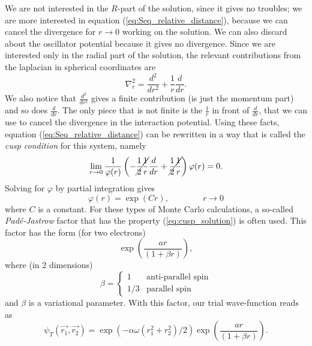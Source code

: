 \documentclass[a4paper,twoside,11pt]{book}
\begin{document}
We are not interested in the $R$-part of the solution, since it gives no troubles; we are more interested in equation (\ref{eq:Seq_relative_distance}), because we can cancel the divergence for $r \to 0$ working on the solution. We can also discard about the oscillator potential because it gives no divergence. Since we are interested only in the radial part of the solution, the relevant contributions from the laplacian in spherical coordinates are
\begin{equation}
    \nabla^2_r = \frac{d^2}{dr^2} + \frac{1}{r}\frac{d}{dr}.
\end{equation}
We also notice that $\frac{d^2}{dr^2}$ gives a finite contribution (is just the momentum part) and so does $\frac{d}{dr}$. The only piece that is not finite is the $\frac{1}{r}$ in front of $\frac{d}{dr}$, that we can use to cancel the divergence in the interaction potential. Using these facts, equation (\ref{eq:Seq_relative_distance}) can be rewritten in a way that is called the \emph{cusp condition} for this system, namely
\begin{equation}
    \lim_{r \to 0} \frac{1}{\varphi(r)}\left( -\cancel{\frac{1}{2}\frac{1}{r}}\frac{d}{dr} + \cancel{\frac{1}{2}\frac{1}{r}} \right)\varphi(r) = 0.
\end{equation}
Solving for $\varphi$ by partial integration gives
\begin{equation}
    \varphi(r) = \exp(Cr),
    \qquad\qquad
    r \to 0
    \label{eq:cusp_solution}
\end{equation}
where $C$ is a constant. For these types of Monte Carlo calculations, a so-called \emph{Padé-Jastrow} factor that has the property (\ref{eq:cusp_solution}) is often used. This factor has the form (for two electrons)
\begin{equation}
    \exp\left( \frac{ar}{(1+\beta r)} \right),
\end{equation}
where (in 2 dimensions)
\begin{equation}
    \beta = 
    \begin{cases}
    1 & \text{anti-parallel spin} \\
    1/3 & \text{parallel spin}
    \end{cases}
\end{equation}
and $\beta$ is a variational parameter. With this factor, our trial wave-function reads as
\begin{equation}
    \psi_T(\vec{r_1},\vec{r_2}) = \exp\left(-\alpha\omega\left(r_1^2 + r_2^2\right)/2\right)\exp\left( \frac{ar}{(1+\beta r)} \right).
    \label{eq:wf_2e}
\end{equation}
\end{document}
